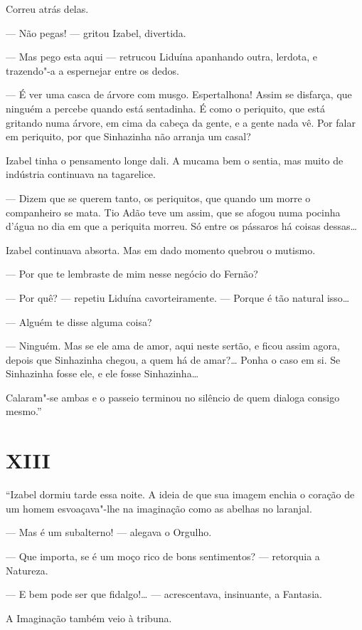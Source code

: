 Correu atrás delas.

--- Não pegas! --- gritou Izabel, divertida.

--- Mas pego esta aqui --- retrucou Liduína apanhando outra, lerdota, e
trazendo"-a a espernejar entre os dedos.

--- É ver uma casca de árvore com musgo. Espertalhona! Assim se
disfarça, que ninguém a percebe quando está sentadinha. É como o
periquito, que está gritando numa árvore, em cima da cabeça da gente, e
a gente nada vê. Por falar em periquito, por que Sinhazinha não arranja
um casal?

Izabel tinha o pensamento longe dali. A mucama bem o sentia, mas muito
de indústria continuava na tagarelice.

--- Dizem que se querem tanto, os periquitos, que quando um morre o
companheiro se mata. Tio Adão teve um assim, que se afogou numa pocinha
d'água no dia em que a periquita morreu. Só entre os pássaros há coisas
dessas\ldots{}

Izabel continuava absorta. Mas em dado momento quebrou o mutismo.

--- Por que te lembraste de mim nesse negócio do Fernão?

--- Por quê? --- repetiu Liduína cavorteiramente. --- Porque é tão
natural isso\ldots{}

--- Alguém te disse alguma coisa?

--- Ninguém. Mas se ele ama de amor, aqui neste sertão, e ficou assim
agora, depois que Sinhazinha chegou, a quem há de amar?\ldots{} Ponha o caso
em si. Se Sinhazinha fosse ele, e ele fosse Sinhazinha\ldots{}

Calaram"-se ambas e o passeio terminou no silêncio de quem dialoga
consigo mesmo.''

\section*{XIII}

``Izabel dormiu tarde essa noite. A ideia de que sua imagem enchia o
coração de um homem esvoaçava"-lhe na imaginação como as abelhas no
laranjal.

--- Mas é um subalterno! --- alegava o Orgulho.

--- Que importa, se é um moço rico de bons sentimentos? --- retorquia a
Natureza.

--- E bem pode ser que fidalgo!\ldots{} --- acrescentava, insinuante, a
Fantasia.

A Imaginação também veio à tribuna.

